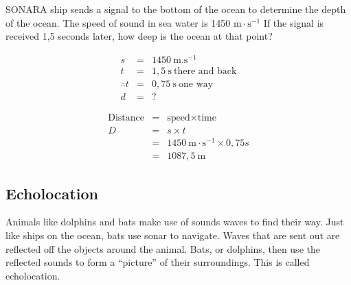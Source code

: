 \begin{wex}{SONAR}{A ship sends a signal to the bottom of the ocean to determine the depth of the ocean. The speed of sound in sea water is 1450 $\text{m}\cdot\text{s}^{-1}$ If the signal is received 1,5 seconds later, how deep is the ocean at that point?}{
\begin{eqnarray*}
s &=& 1450 \ \text{m}.\text{s}^{-1}\\
t &=& 1,5 \ \text{s} \ \text{there \ and \ back}\\
\therefore t &= & 0,75 \ \text{s} \ \text{one \ way}\\
d &=& ?
\end{eqnarray*}

\begin{eqnarray*}
\text{Distance} &=& \text{speed} \times \text{time} \\
D &=& s \times t \\
&=& 1450~\text{m}\cdot\text{s}^{-1} \times 0,75 s \\
&=& 1087,5 \ \text{m}
\end{eqnarray*}
}\end{wex}
 
\subsection{Echolocation}
            \nopagebreak
        \label{m38800*id185251}Animals like dolphins and bats make use of sounds waves to find their way. Just like ships on the ocean, bats use sonar to navigate. Waves that are sent out are reflected off the objects around the animal. Bats, or dolphins, then use the reflected sounds to form a ``picture'' of their surroundings. This is called echolocation.\par 


